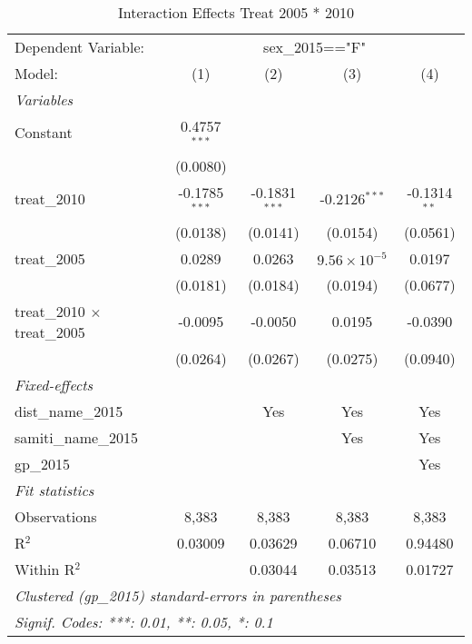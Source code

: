 
\begin{table}[htbp]
   \caption{Interaction Effects Treat 2005 * 2010}
   \centering
   \begin{tabular}{lcccc}
      \tabularnewline \midrule \midrule
      Dependent Variable: & \multicolumn{4}{c}{sex\_2015=="F"}\\
      Model:                              & (1)             & (2)             & (3)                   & (4)\\  
      \midrule
      \emph{Variables}\\
      Constant                            & 0.4757$^{***}$  &                 &                       &   \\   
                                          & (0.0080)        &                 &                       &   \\   
      treat\_2010                         & -0.1785$^{***}$ & -0.1831$^{***}$ & -0.2126$^{***}$       & -0.1314$^{**}$\\   
                                          & (0.0138)        & (0.0141)        & (0.0154)              & (0.0561)\\   
      treat\_2005                         & 0.0289          & 0.0263          & $9.56\times 10^{-5}$  & 0.0197\\   
                                          & (0.0181)        & (0.0184)        & (0.0194)              & (0.0677)\\   
      treat\_2010 $\times$ treat\_2005    & -0.0095         & -0.0050         & 0.0195                & -0.0390\\   
                                          & (0.0264)        & (0.0267)        & (0.0275)              & (0.0940)\\   
      \midrule
      \emph{Fixed-effects}\\
      dist\_name\_2015                    &                 & Yes             & Yes                   & Yes\\  
      samiti\_name\_2015                  &                 &                 & Yes                   & Yes\\  
      gp\_2015                            &                 &                 &                       & Yes\\  
      \midrule
      \emph{Fit statistics}\\
      Observations                        & 8,383           & 8,383           & 8,383                 & 8,383\\  
      R$^2$                               & 0.03009         & 0.03629         & 0.06710               & 0.94480\\  
      Within R$^2$                        &                 & 0.03044         & 0.03513               & 0.01727\\  
      \midrule \midrule
      \multicolumn{5}{l}{\emph{Clustered (gp\_2015) standard-errors in parentheses}}\\
      \multicolumn{5}{l}{\emph{Signif. Codes: ***: 0.01, **: 0.05, *: 0.1}}\\
   \end{tabular}
\end{table}


